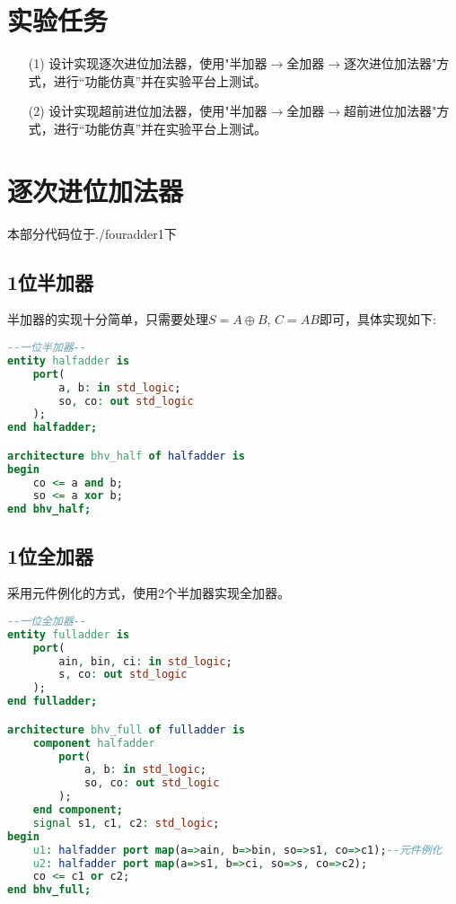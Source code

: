 \documentclass[UTF8, onecolumn, a4paper]{article}
\begin{document}
\section{实验任务}
\begin{enumerate}
	\item[(1)] 设计实现逐次进位加法器，使用"半加器$\rightarrow$全加器$\rightarrow$逐次进位加法器"方式，进行“功能仿真”并在实验平台上测试。
	\item[(2)] 设计实现超前进位加法器，使用"半加器$\rightarrow$全加器$\rightarrow$超前进位加法器"方式，进行“功能仿真”并在实验平台上测试。
\end{enumerate}
	

\section{逐次进位加法器}
本部分代码位于./fouradder1下
\subsection{1位半加器}
半加器的实现十分简单，只需要处理$S = A \oplus B$, $C = AB$即可，具体实现如下:
\begin{lstlisting}[language={VHDL}, title={halfadder.vhd}]
--一位半加器--
entity halfadder is
	port(
		a, b: in std_logic;
		so, co: out std_logic
	);
end halfadder;

architecture bhv_half of halfadder is
begin
	co <= a and b;
	so <= a xor b;
end bhv_half;
\end{lstlisting}
\subsection{1位全加器}
采用元件例化的方式，使用2个半加器实现全加器。
\begin{lstlisting}[language={VHDL}, title={fulladder.vhd}]
--一位全加器--
entity fulladder is
	port(
		ain, bin, ci: in std_logic;
		s, co: out std_logic
	);
end fulladder;

architecture bhv_full of fulladder is
	component halfadder
		port(
			a, b: in std_logic;
			so, co: out std_logic
		);
	end component;
	signal s1, c1, c2: std_logic;
begin
	u1: halfadder port map(a=>ain, b=>bin, so=>s1, co=>c1);--元件例化
	u2: halfadder port map(a=>s1, b=>ci, so=>s, co=>c2);
	co <= c1 or c2;
end bhv_full;
\end{lstlisting}
\end{document}
